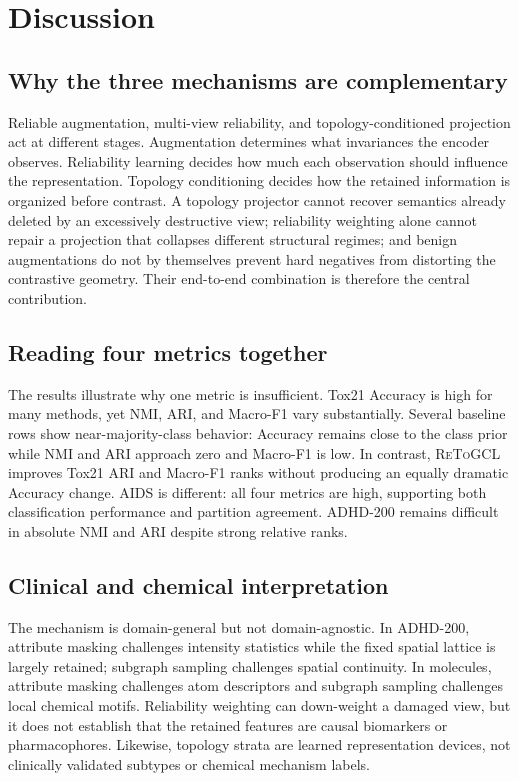 \documentclass[10pt,twocolumn]{article}
\newcommand{\method}{\textsc{ReToGCL}}
\begin{document}
\section{Discussion}

\subsection{Why the three mechanisms are complementary}

Reliable augmentation, multi-view reliability, and topology-conditioned projection act at different stages. Augmentation determines what invariances the encoder observes. Reliability learning decides how much each observation should influence the representation. Topology conditioning decides how the retained information is organized before contrast. A topology projector cannot recover semantics already deleted by an excessively destructive view; reliability weighting alone cannot repair a projection that collapses different structural regimes; and benign augmentations do not by themselves prevent hard negatives from distorting the contrastive geometry. Their end-to-end combination is therefore the central contribution.

\subsection{Reading four metrics together}

The results illustrate why one metric is insufficient. Tox21 Accuracy is high for many methods, yet NMI, ARI, and Macro-F1 vary substantially. Several baseline rows show near-majority-class behavior: Accuracy remains close to the class prior while NMI and ARI approach zero and Macro-F1 is low. In contrast, \method{} improves Tox21 ARI and Macro-F1 ranks without producing an equally dramatic Accuracy change. AIDS is different: all four metrics are high, supporting both classification performance and partition agreement. ADHD-200 remains difficult in absolute NMI and ARI despite strong relative ranks.

\subsection{Clinical and chemical interpretation}

The mechanism is domain-general but not domain-agnostic. In ADHD-200, attribute masking challenges intensity statistics while the fixed spatial lattice is largely retained; subgraph sampling challenges spatial continuity. In molecules, attribute masking challenges atom descriptors and subgraph sampling challenges local chemical motifs. Reliability weighting can down-weight a damaged view, but it does not establish that the retained features are causal biomarkers or pharmacophores. Likewise, topology strata are learned representation devices, not clinically validated subtypes or chemical mechanism labels.
\end{document}
